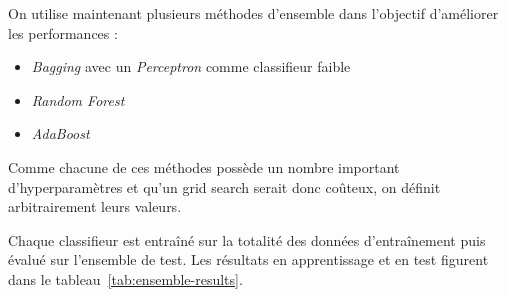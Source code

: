 \documentclass[12pt]{article}
\newcommand{\tabref}[1]{tableau~\ref{#1}}
\begin{document}
On utilise maintenant plusieurs méthodes d'ensemble dans l'objectif d'améliorer
les performances :

\begin{itemize}
    \item \emph{Bagging} avec un \emph{Perceptron} comme classifieur faible
    \item \emph{Random Forest}
    \item \emph{AdaBoost}
\end{itemize}

Comme chacune de ces méthodes possède un nombre important d'hyperparamètres et
qu'un grid search serait donc coûteux, on définit arbitrairement leurs valeurs.

Chaque classifieur est entraîné sur la totalité des données d'entraînement puis
évalué sur l'ensemble de test. Les résultats en apprentissage et en test
figurent dans le \tabref{tab:ensemble-results}.

\begin{table}[H]
\caption{Performances obtenues par chaque méthode}
\label{tab:ensemble-results}
\end{table}
\end{document}
